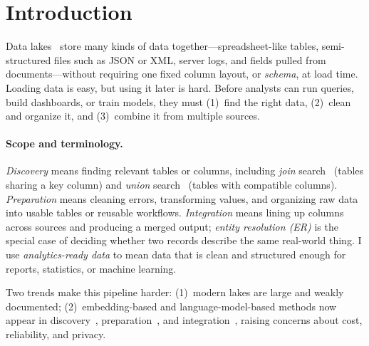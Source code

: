 \documentclass[sigconf]{acmart}
\begin{document}




\maketitle

\section{Introduction}
Data lakes~\cite{10.1145/3555041.3589409,10.14778/3750601.3750694} store many kinds of data together---spreadsheet-like tables, semi-structured files such as JSON or XML, server logs, and fields pulled from documents---without requiring one fixed column layout, or \emph{schema}, at load time.
Loading data is easy, but using it later is hard.
Before analysts can run queries, build dashboards, or train models, they must (1)~find the right data, (2)~clean and organize it, and (3)~combine it from multiple sources.

\paragraph{Scope and terminology.}
\emph{Discovery} means finding relevant tables or columns, including \emph{join} search~\cite{10.1145/3555041.3589409} (tables sharing a key column) and \emph{union} search~\cite{10.14778/3750601.3750694} (tables with compatible columns). \emph{Preparation} means cleaning errors, transforming values, and organizing raw data into usable tables or reusable workflows. \emph{Integration} means lining up columns across sources and producing a merged output; \emph{entity resolution (ER)} is the special case of deciding whether two records describe the same real-world thing. I use \emph{analytics-ready data} to mean data that is clean and structured enough for reports, statistics, or machine learning.

Two trends make this pipeline harder: (1)~modern lakes are large and weakly documented; (2)~embedding-based and language-model-based methods now appear in discovery~\cite{10.14778/3659437.3659461}, preparation~\cite{10.14778/3611540.3611624}, and integration~\cite{10.14778/3742728.3742757}, raising concerns about cost, reliability, and privacy.
\end{document}

